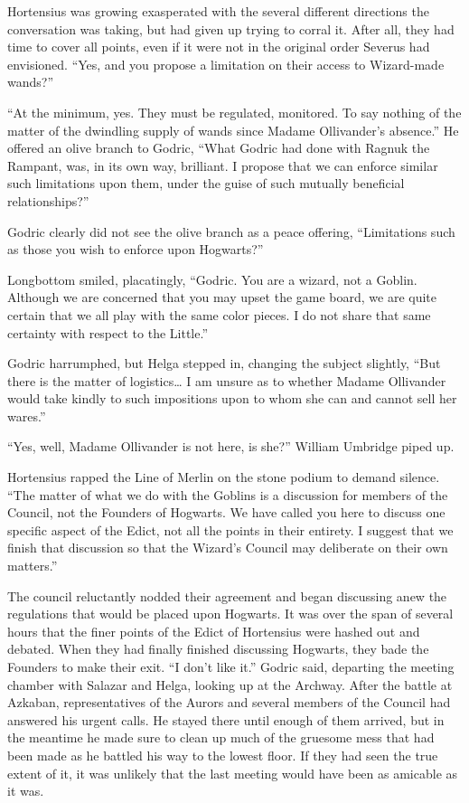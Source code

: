 Hortensius was growing exasperated with the several different directions the conversation was taking, but had given up trying to corral it. After all, they had time to cover all points, even if it were not in the original order Severus had envisioned. “Yes, and you propose a limitation on their access to Wizard-made wands?”

“At the minimum, yes. They must be regulated, monitored. To say nothing of the matter of the dwindling supply of wands since Madame Ollivander’s absence.” He offered an olive branch to Godric, “What Godric had done with Ragnuk the Rampant, was, in its own way, brilliant. I propose that we can enforce similar such limitations upon them, under the guise of such mutually beneficial relationships?”

Godric clearly did not see the olive branch as a peace offering, “Limitations such as those you wish to enforce upon Hogwarts?”

Longbottom smiled, placatingly, “Godric. You are a wizard, not a Goblin. Although we are concerned that you may upset the game board, we are quite certain that we all play with the same color pieces. I do not share that same certainty with respect to the Little.”

Godric harrumphed, but Helga stepped in, changing the subject slightly, “But there is the matter of logistics… I am unsure as to whether Madame Ollivander would take kindly to such impositions upon to whom she can and cannot sell her wares.”

“Yes, well, Madame Ollivander is not here, is she?” William Umbridge piped up.

Hortensius rapped the Line of Merlin on the stone podium to demand silence. “The matter of what we do with the Goblins is a discussion for members of the Council, not the Founders of Hogwarts. We have called you here to discuss one specific aspect of the Edict, not all the points in their entirety. I suggest that we finish that discussion so that the Wizard’s Council may deliberate on their own matters.”

The council reluctantly nodded their agreement and began discussing anew the regulations that would be placed upon Hogwarts. It was over the span of several hours that the finer points of the Edict of Hortensius were hashed out and debated. When they had finally finished discussing Hogwarts, they bade the Founders to make their exit.
\simpleline
“I don’t like it.” Godric said, departing the meeting chamber with Salazar and Helga, looking up at the Archway. After the battle at Azkaban, representatives of the Aurors and several members of the Council had answered his urgent calls. He stayed there until enough of them arrived, but in the meantime he made sure to clean up much of the gruesome mess that had been made as he battled his way to the lowest floor. If they had seen the true extent of it, it was unlikely that the last meeting would have been as amicable as it was.

